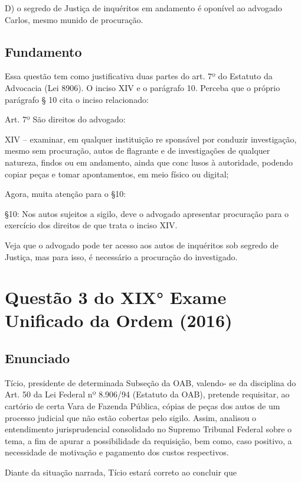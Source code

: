 \documentclass[12pt]{article}
\begin{document}
D) o segredo de Justiça de inquéritos em andamento é 
oponível ao advogado Carlos, mesmo munido de 
procuração. 


\subsection{Fundamento}

Essa questão tem como justificativa duas partes do art. 7º do Estatuto da Advocacia (Lei 8906). O inciso XIV e o parágrafo 10. Perceba que o próprio parágrafo § 10 cita o inciso relacionado: 

Art. 7º São direitos do advogado: 

XIV – examinar, em qualquer instituição re sponsável por conduzir investigação, mesmo sem procuração, autos de flagrante e de investigações de qualquer natureza, findos ou em andamento, ainda que conc lusos à autoridade, podendo copiar peças e tomar apontamentos, em meio físico ou digital; 

Agora, muita atenção para o §10:

§10: Nos autos sujeitos a sigilo, deve o advogado 
apresentar procuração para o exercício dos direitos de que trata o inciso XIV. 

Veja que o advogado pode ter acesso aos autos de inquéritos sob segredo de Justiça, mas para isso, é necessário a procuração do investigado. 


\section{Questão 3 do XIX° Exame Unificado da Ordem (2016)}

\subsection{Enunciado}

Tício, presidente de determinada Subseção da OAB, valendo-
se da disciplina do Art. 50 da Lei Federal nº 8.906/94 (Estatuto 
da OAB), pretende requisitar, ao cartório de certa Vara de 
Fazenda Pública, cópias de peças dos autos de um processo 
judicial que não estão cobertas pelo sigilo. Assim, analisou o 
entendimento jurisprudencial consolidado no Supremo 
Tribunal Federal sobre o tema, a fim de apurar a possibilidade 
da requisição, bem como, caso positivo, a necessidade de 
motivação e pagamento dos custos respectivos. 
 
Diante da situação narrada, Tício estará correto ao concluir 
que 
\end{document}

